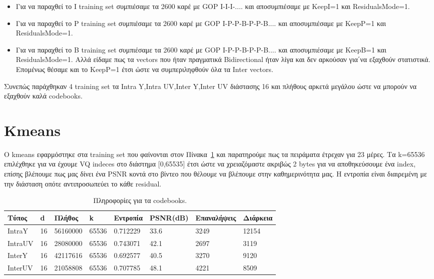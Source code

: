 \begin{itemize}
    \item Για να παραχθεί το I training set συμπιέσαμε τα 2600 καρέ με GOP I-I-I-.... και αποσυμπιέσαμε με KeepI=1 και ResidualsMode=1.
    \item Για να παραχθεί το P training set συμπιέσαμε τα 2600 καρέ με GOP I-P-P-B-P-P-B.... και αποσυμπιέσαμε με KeepP=1 και ResidualsMode=1.
    \item Για να παραχθεί το B training set συμπιέσαμε τα 2600 καρέ με GOP I-P-P-B-P-P-B.... και αποσυμπιέσαμε με KeepB=1 και ResidualsMode=1. Αλλά είδαμε πως τα vectors που ήταν πραγματικά Bidirectional ήταν λίγα και δεν αρκούσαν για΄να εξαχθούν στατιστικά. Επομένως θέσαμε και το KeepP=1 έτσι ώστε να συμπεριληφθούν όλα τα Inter vectors.
\end{itemize}

\indent Συνεπώς παράχθηκαν 4 training set τα Intra Y,Intra UV,Inter Y,Inter UV διάστασης 16 και πλήθους αρκετά μεγάλου ώστε να μπορούν να εξαχθούν καλά codebooks.

\section{Kmeans}
\label{section:sect44}

\indent Ο kmeans εφαρμόστηκε στα training set που φαίνονται στον Πίνακα~\ref{table:trainingset} και παρατηρούμε πως τα πειράματα έτρεχαν για 23 μέρες. Τα k=65536 επιλέχθηκε για να έχουμε VQ indeces στο διάστημα [0,65535] έτσι ώστε να χρειαζόμαστε ακριβώς 2 bytes για να αποθηκεύσουμε ένα index, επίσης βλέπουμε πως μας δίνει ένα PSNR κοντά στο βίντεο που θέλουμε να βλέπουμε στην καθημερινότητα μας. Η εντροπία είναι διαιρεμένη με την διάσταση οπότε αντιπροσωπεύει το κάθε residual.

\begin{table}[h!]
    \begin{center}
        \begin{tabular}{| l | l | l | l | l | l | l | l |}
        \hline
        Τύπος    & d  & Πλήθος   & k     & Εντροπία  & PSNR(dB) & Επαναλήψεις   & Διάρκεια\\ \hline
        IntraY   & 16 & 56160000 & 65536 & 0.712229  & 33.6     &  3249         & 12154                   \\ \hline
        IntraUV  & 16 & 28080000 & 65536 & 0.743071  & 42.1     &  2697         & 3119                    \\ \hline
        InterY   & 16 & 42117616 & 65536 & 0.692577  & 40.5     &  3270         & 9120                    \\ \hline
        InterUV  & 16 & 21058808 & 65536 & 0.707785  & 48.1     &  4221         & 8509                    \\ \hline
        \hline
        \end{tabular}
    \end{center}

    \caption{Πληροφορίες για τα codebooks.}
    \label{table:trainingset}
\end{table}

